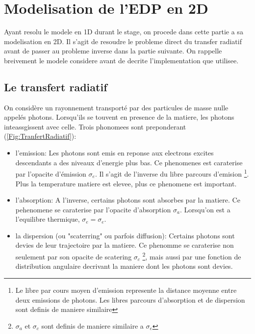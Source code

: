 
\chapter{Modelisation de l'EDP en 2D} %

\label{Chapter3} %


Ayant resolu le modele en 1D durant le stage, on procede dans cette partie a sa modelisation en 2D. Il s'agit de resoudre le probleme direct du transfer radiatif avant de passer au probleme inverse dans la partie suivante. On rappelle breivement le modele considere avant de decrite l'implementation que utilisee.

\section{Le transfert radiatif}


On considère un rayonnement transporté par des particules de masse nulle appelés photons. Lorsqu'ils se touvent en presence de la matiere, les photons inteassgissent avec celle. Trois phonomees sont preponderant (\ref{Fig:TranfertRadiatif}):

\begin{itemize}
 \item l'emission: Les photons sont emis en reponse aux electrons excites descendants a des niveaux d'energie plus bas. Ce phenomenes est caraterise par l'opacite d'émission $\sigma_e$. Il s'agit de l'inverse du libre parcours d'emision \footnote{Le libre par cours moyen d'emission represente la distance moyenne entre deux emissions de photons. Les libres parcours d'absorption et de dispersion sont definis de maniere similaire}. Plus la temperature matiere est elevee, plus ce phenomene est important.
 \item l'absorption: A l'inverse, certains photons sont absorbes par la matiere. Ce pehenomene se caraterise par l'opacite d'absorption $\sigma_a$. Lorsqu'on est a l'equilibre thermique, $\sigma_e = \sigma_e$.
 \item la dispersion (ou "scaterring" ou parfois diffusion): Certains photons sont devies de leur trajectoire par la matiere. Ce phenomme se caraterise non seulement par son opacite de scatering $\sigma_c$ \footnote{ $\sigma_a$ et $\sigma_c$ sont definis de maniere similaire a $\sigma_e$}, mais aussi par une fonction de distribution angulaire decrivant la maniere dont les photons sont devies.
\end{itemize}

